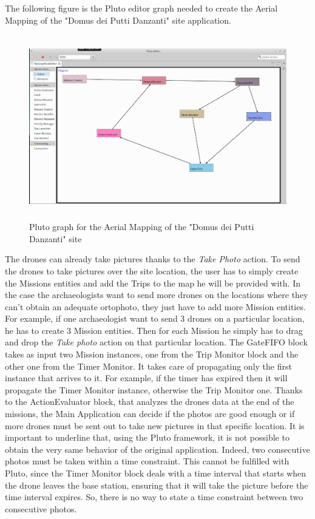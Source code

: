The following figure is the Pluto editor graph needed to create the Aerial Mapping of the "Domus dei Putti Danzanti" site application. 

\begin{figure}[H]
  \centering
  \includegraphics[width=\linewidth, height=8cm]{pictures/puttiEditor.png}
  \caption{Pluto graph for the Aerial Mapping of the "Domus dei Putti Danzanti" site}
  \label{fig:puttiGraph}
\end{figure}

The drones can already take pictures thanks to the \textit{Take Photo} action.
To send the drones to take pictures over the site location, the user has to simply create the Missions entities and add the Trips to the map he will be provided with.
In the case the archaeologists want to send more drones on the locations where they can't obtain an adequate ortophoto, they just have to add more Mission entities.
For example, if one archaeologist want to send 3 drones on a particular location, he has to create 3 Mission entities.
Then for each Mission he simply  has to drag and drop the \textit{Take photo} action on that particular location.
The GateFIFO block takes as input two Mission instances, one from the Trip Monitor block and the other one from the Timer Monitor.
It takes care of propagating only the first instance that arrives to it.
For example, if the timer has expired then it will propagate the Timer Monitor instance, otherwise the Trip Monitor one.
Thanks to the ActionEvaluator block, that analyzes the drones data at the end of the missions, the Main Application can decide if the photos are good enough or if more drones must be sent out to take new pictures in that specific location.
It is important to underline that, using the Pluto framework, it is not possible to obtain the very same behavior of the original application.
Indeed, two consecutive photos must be taken within a time constraint.
This cannot be fulfilled with Pluto, since the Timer Monitor block deals with a time interval that starts when the drone leaves the base station, ensuring that it will take the picture before the time interval expires.
So, there is no way to state a time constraint between two consecutive photos.


